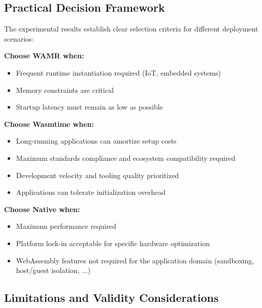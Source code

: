 

\subsection{Practical Decision Framework}
\label{subsec:decision-framework}

The experimental results establish clear selection criteria for different deployment scenarios:

\textbf{Choose WAMR when:}
\begin{itemize}
    \item Frequent runtime instantiation required (IoT, embedded systems)
    \item Memory constraints are critical 
    \item Startup latency must remain as low as possible
\end{itemize}

\textbf{Choose Wasmtime when:}
\begin{itemize}
    \item Long-running applications can amortize setup costs
    \item Maximum standards compliance and ecosystem compatibility required
    \item Development velocity and tooling quality prioritized
    \item Applications can tolerate initialization overhead
\end{itemize}

\textbf{Choose Native when:}
\begin{itemize}
    \item Maximum performance required
    \item Platform lock-in acceptable for specific hardware optimization
    \item WebAssembly features not required for the application domain (sandboxing, host/guest isolation, ...)
\end{itemize}

\subsection{Limitations and Validity Considerations}
\label{subsec:limitations}

